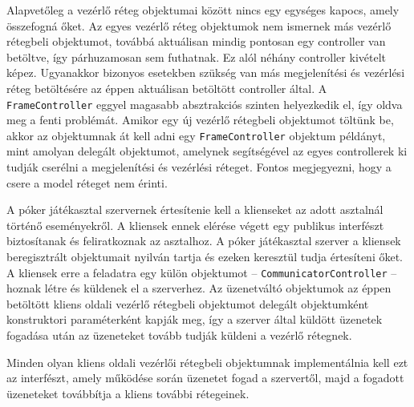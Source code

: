 Alapvetőleg a vezérlő réteg objektumai között nincs egy egységes kapocs, amely összefogná őket. Az egyes vezérlő réteg objektumok nem ismernek más vezérlő rétegbeli objektumot, továbbá aktuálisan mindig pontosan egy controller van betöltve, így párhuzamosan sem futhatnak. Ez alól néhány controller kivételt képez. Ugyanakkor bizonyos esetekben szükség van más megjelenítési és vezérlési réteg betöltésére az éppen aktuálisan betöltött controller által. A \texttt{FrameController} eggyel magasabb absztrakciós szinten helyezkedik el, így oldva meg a fenti problémát. Amikor egy új vezérlő rétegbeli objektumot töltünk be, akkor az objektumnak át kell adni egy \texttt{FrameController} objektum példányt, mint amolyan delegált objektumot, amelynek segítségével az egyes controllerek ki tudják cserélni a megjelenítési és vezérlési réteget. Fontos megjegyezni, hogy a csere a model réteget nem érinti.

A póker játékasztal szervernek értesítenie kell a klienseket az adott asztalnál történő eseményekről. A kliensek ennek elérése végett egy publikus interfészt biztosítanak és feliratkoznak az asztalhoz. A póker játékasztal szerver a kliensek beregisztrált objektumait nyilván tartja és ezeken keresztül tudja értesíteni őket. A kliensek erre a feladatra egy külön objektumot -- \texttt{CommunicatorController} -- hoznak létre és küldenek el a szerverhez. Az üzenetváltó objektumok az éppen betöltött kliens oldali vezérlő rétegbeli objektumot delegált objektumként konstruktori paraméterként kapják meg, így a szerver által küldött üzenetek fogadása után az üzeneteket tovább tudják küldeni a vezérlő rétegnek.

Minden olyan kliens oldali vezérlői rétegbeli objektumnak implementálnia kell ezt az interfészt, amely működése során üzenetet fogad a szervertől, majd a fogadott üzeneteket továbbítja a kliens további rétegeinek.

